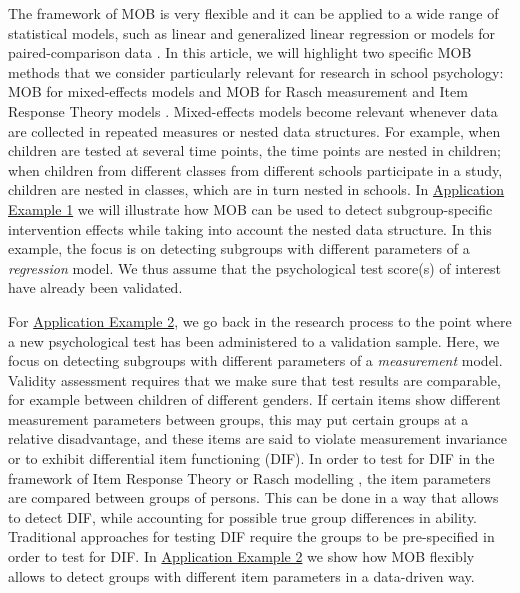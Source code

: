 \documentclass[doc,floatsintext,natbib]{apa7}
\begin{document}
The framework of MOB is very flexible and it can be applied to a wide range of statistical models, such as linear and generalized linear regression \citep{KopAugStr:2013,ZeilyHoth08} or models for paired-comparison data \citep{StrWicZei:2011:JoEaBS,WiedyFrick21}. In this article, we will highlight two specific MOB methods that we consider particularly relevant for research in school psychology: MOB for mixed-effects models \citep{FokkySmit18} and MOB for Rasch measurement and Item Response Theory models \citep[IRT,][]{StrKopZei:2015:P,KomStrZei:2017:EaPM,HenDebStr:2023:EPM}. Mixed-effects models become relevant whenever data are collected in repeated measures or nested data structures. For example, when children are tested at several time points, the time points are nested in children; when children from different classes from different schools participate in a study, children are nested in classes, which are in turn nested in schools. In \hyperref[sec:TutorialMixed]{Application Example 1} we will illustrate how MOB can be used to detect subgroup-specific intervention effects while taking into account the nested data structure. In this example, the focus is on detecting subgroups with different parameters of a \textit{regression} model. We thus assume that the psychological test score(s) of interest have already been validated. 


For \hyperref[sec:TutorialRasch]{Application Example 2}, we go back in the research process to the point where a new psychological test has been administered to a validation sample. Here, we focus on detecting subgroups with different parameters of a \textit{measurement} model. Validity assessment requires that we make sure that test results are comparable, for example between children of different genders. If certain items show different measurement parameters between groups, this may put certain groups at a relative disadvantage, and these items are said to violate measurement invariance or to exhibit differential item functioning (DIF). In order to test for DIF in the framework of Item Response Theory or Rasch modelling \citep{AnthyDiPe16,DebStrZei:2022:CRC,Mall97}, the item parameters are compared between groups of persons. This can be done in a way that allows to detect DIF, while accounting for possible true group differences in ability. Traditional approaches for testing DIF require the groups to be pre-specified in order to test for DIF. In \hyperref[sec:TutorialRasch]{Application Example 2} we show how MOB flexibly allows to detect groups with different item parameters in a data-driven way. 
\end{document}
